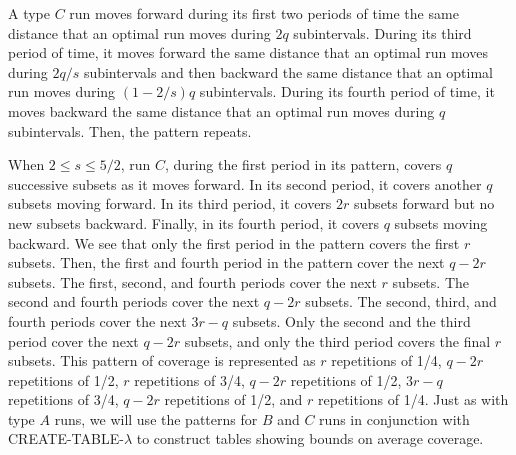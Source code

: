 \documentclass[11pt]{article}
\begin{document}
A type $C$ run moves forward during its first two periods of time the same distance that an optimal run moves during $2q$ subintervals.  During its third period of time, it moves forward the same distance that an optimal run moves during $2q/s$ subintervals and then backward the same distance that an optimal run moves during $(1 - 2/s)q$ subintervals.  During its fourth period of time, it moves backward the same distance that an optimal run moves during $q$ subintervals.  Then, the pattern repeats.  

When $2 \leq s \leq 5/2$, run $C$, during the first period in its pattern, covers $q$ successive subsets as it moves forward.  In its second period, it covers another $q$ subsets moving forward.  In its third period, it covers $2r$ subsets forward but no new subsets backward.  Finally, in its fourth period, it covers $q$ subsets moving backward.  We see that only the first period in the pattern covers the first $r$ subsets.  Then, the first and fourth period in the pattern cover the next $q - 2r$ subsets.  The first, second, and fourth periods cover the next $r$ subsets.  The second and fourth periods cover the next $q - 2r$ subsets.  The second, third, and fourth periods cover the next $3r - q$ subsets.  Only the second and the third period cover the next $q - 2r$ subsets, and only the third period covers the final $r$ subsets.  This pattern of coverage is represented as $r$ repetitions of 1/4, $q - 2r$ repetitions of 1/2, $r$ repetitions of 3/4, $q - 2r$ repetitions of 1/2, $3r - q$ repetitions of 3/4, $q - 2r$ repetitions of 1/2, and $r$ repetitions of 1/4.  Just as with type $A$ runs, we will use the patterns for $B$ and $C$ runs in conjunction with CREATE-TABLE-$\lambda$ to construct tables showing bounds on average coverage.
\end{document}
